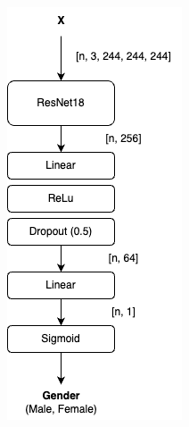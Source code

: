 \begin{figure}[b]
\begin{subfigure}{0.4\linewidth}
    \end{subfigure}
    \begin{subfigure}{0.4\linewidth}
        \centering
        \includegraphics[width=\linewidth]{images/GenderModel.png}

\end{subfigure}
\end{figure}
